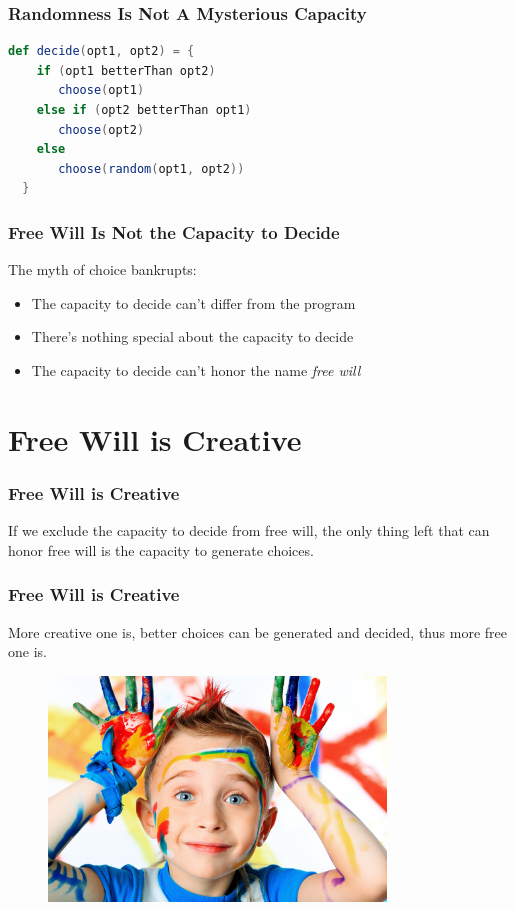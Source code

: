 \documentclass[xcolor=dvipsnames]{beamer}
\theoremstyle{definition}
\begin{document}
\begin{frame}[fragile]
  \frametitle{Randomness Is Not A Mysterious Capacity}

  \begin{lstlisting}[language=Scala]
  def decide(opt1, opt2) = {
    if (opt1 betterThan opt2)
       choose(opt1)
    else if (opt2 betterThan opt1)
       choose(opt2)
    else
       choose(random(opt1, opt2))
  }
  \end{lstlisting}
\end{frame}

\begin{frame}[fragile]
  \frametitle{Free Will Is Not the Capacity to Decide}

  The \alert{myth of choice} bankrupts:
  \begin{itemize}
  \item The capacity to decide can't differ from the program
  \item There's nothing special about the capacity to decide
  \item The capacity to decide can't honor the name \emph{free will}
  \end{itemize}
\end{frame}


\section{Free Will is Creative} %
\label{sec:creative}

\begin{frame}[fragile]
  \frametitle{Free Will is Creative}

  If we exclude the \alert{capacity to decide} from free will, the only thing left that can honor free will is \alert{the capacity to generate choices}.
\end{frame}

\begin{frame}[fragile]
  \frametitle{Free Will is Creative}

  More creative one is, better choices can be generated and decided, thus more free one is.

  \begin{figure}
    \centering
    \includegraphics[width=0.8\textwidth]{images/creativity.jpg}\\
  \end{figure}
\end{frame}
\end{document}
